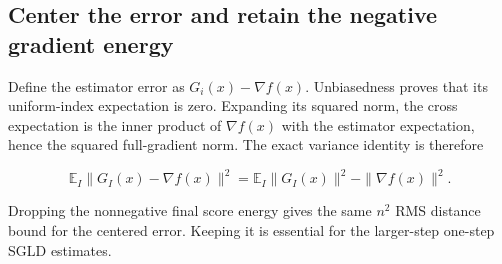 \documentclass[11pt,a4paper]{report}
\begin{document}
\subsection{\texorpdfstring{Center the error and retain the negative gradient energy}{Center the error and retain the negative gradient energy}}
\label{report-step-AverageLMC-SGLDEstimator-lean-5}


Define the estimator error as \(G_i(x)-\nabla f(x)\). Unbiasedness proves that its uniform-index expectation is zero. Expanding its squared norm, the cross expectation is the inner product of \(\nabla f(x)\) with the estimator expectation, hence the squared full-gradient norm. The exact variance identity is therefore

\[\mathbb E_I\|G_I(x)-\nabla f(x)\|^2=\mathbb E_I\|G_I(x)\|^2-\|\nabla f(x)\|^2.\]

Dropping the nonnegative final score energy gives the same \(n^2\) RMS distance bound for the centered error. Keeping it is essential for the larger-step one-step SGLD estimates.
\end{document}
